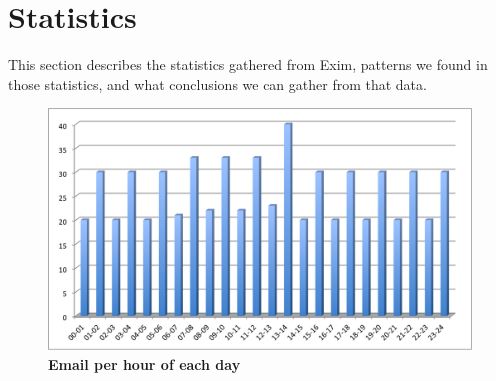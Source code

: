 \section{Statistics}
This section describes the statistics gathered from Exim, patterns we
found in those statistics, and what conclusions we can gather from that
data.

\begin{figure}
  \vspace{-30pt}
  \begin{center}
    \includegraphics[scale=0.5]{img/per-hour.png}
  \end{center}
  \vspace{-20pt}
  \caption{\bf{Email per hour of each day}}
  \label{fig:mailperhour}
  \hspace*{20pt}
\end{figure}

